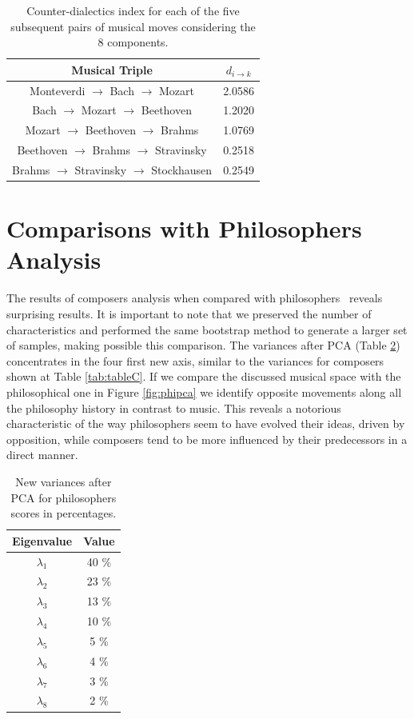 \documentclass[
 aip,
 jmp,
 amsmath,amssymb,
 reprint,
]{revtex4-1}
\begin{document}
\begin{table}[ht]
\caption{\label{tab:tableE} Counter-dialectics index for each
of the five subsequent pairs of musical moves considering the 8 components.}

\begin{tabular}{|c||c|}
\hline
Musical Triple & $d_{i \rightarrow k}$ \\
\hline \hline

 Monteverdi $\to$ Bach $\to$ Mozart          & 2.0586 \\
 Bach $\to$ Mozart $\to$ Beethoven           & 1.2020 \\
 Mozart $\to$ Beethoven $\to$ Brahms         & 1.0769 \\
 Beethoven $\to$ Brahms $\to$ Stravinsky     & 0.2518 \\
 Brahms $\to$ Stravinsky $\to$ Stockhausen   & 0.2549 \\

\hline
\end{tabular}
\end{table}

\section{Comparisons with Philosophers Analysis}

The results of composers analysis when compared with philosophers~\cite{Fabbri}
reveals surprising results. It is important to note that we preserved the
number of characteristics and performed the same bootstrap method to
generate a larger set of samples, making possible this
comparison. The variances after PCA (Table \ref{tab:varphi}) concentrates in the four
first new axis, similar to the variances for composers shown at Table \ref{tab:tableC}. If we compare the discussed musical space
with the philosophical one in Figure \ref{fig:phipca} we
identify opposite movements along all the philosophy history in contrast
to music. This reveals a notorious characteristic of the way
philosophers seem to have evolved their ideas, driven by opposition, while
composers tend to be more influenced by their predecessors in a direct manner.

\begin{table}[ht]
\caption{\label{tab:varphi}New variances after PCA for philosophers
  scores in percentages.}

\begin{tabular}{|c||c|}
\hline
Eigenvalue  & Value     \\ \hline

$\lambda_1$ &  40 \% \\
$\lambda_2$ &  23 \% \\
$\lambda_3$ &  13 \% \\
$\lambda_4$ &  10 \% \\
$\lambda_5$ &   5 \% \\
$\lambda_6$ &   4 \% \\
$\lambda_7$ &   3 \% \\
$\lambda_8$ &   2 \% \\
\hline

\end{tabular}
\end{table}
\end{document}
